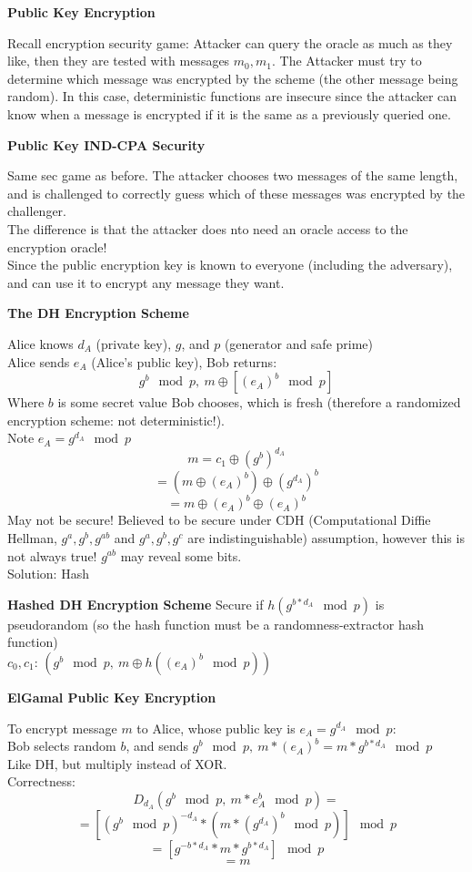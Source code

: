 \documentclass{article}
\begin{document}
\textbf{Public Key Encryption}

Recall encryption security game: Attacker can query the oracle as much as they like, then they are tested with messages $m_0,m_1$. The Attacker must try to determine which message was encrypted by the scheme (the other message being random). In this case, deterministic functions are insecure since the attacker can know when a message is encrypted if it is the same as a previously queried one.

\textbf{Public Key IND-CPA Security}

Same sec game as before. The attacker chooses two messages of the same length, and is challenged to correctly guess which of these messages was encrypted by the challenger.\\
The difference is that the attacker does nto need an oracle access to the encryption oracle!\\
Since the public encryption key is known to everyone (including the adversary), and can use it to encrypt any message they want.

\textbf{The DH Encryption Scheme}

Alice knows $d_A$ (private key), $g$, and $p$ (generator and safe prime)\\
Alice sends $e_A$ (Alice's public key), Bob returns:
\[
	g^b\mod p,\ m\oplus\left[ (e_A)^b\mod p\right]
\]
Where $b$ is some secret value Bob chooses, which is fresh (therefore a randomized encryption scheme: not deterministic!).\\
Note $e_A = g^{d_A}\mod p$
\[
	m=c_1\oplus (g^b)^{d_A}
\]\[
	=\left(m\oplus (e_A)^b\right) \oplus (g^{d_A})^b
\]\[
	=m\oplus (e_A)^b\oplus (e_A)^b
\]
May not be secure! Believed to be secure under CDH (Computational Diffie Hellman, $g^a,g^b,g^{ab}$ and $g^a,g^b,g^c$ are indistinguishable) assumption, however this is not always true! $g^{ab}$ may reveal some bits.\\
Solution: Hash

\textbf{Hashed DH Encryption Scheme}
Secure if $h(g^{b*d_A}\mod p)$ is pseudorandom (so the hash function must be a randomness-extractor hash function)\\
$c_0,c_1$: $\left(g^b\mod p,\ m\oplus h\left((e_A)^b\mod p\right)\right)$

\textbf{ElGamal Public Key Encryption}

To encrypt message $m$ to Alice, whose public key is $e_A=g^{d_A}\mod p$:\\
Bob selects random $b$, and sends $g^b\mod p,\ m*(e_A)^b=m*g^{b*d_A}\mod p$\\
Like DH, but multiply instead of XOR.\\
Correctness:
\[ D_{d_A}(g^b\mod p,\ m*e_A^b\mod p)= \]
\[ =\left[(g^b\mod p)^{-d_A}*\left(m*(g^{d_A})^b\mod p\right)\right]\mod p \]
\[ =[g^{-b*d_A}*m*g^{b*d_A}]\mod p \]
\[ =m \]
\end{document}
